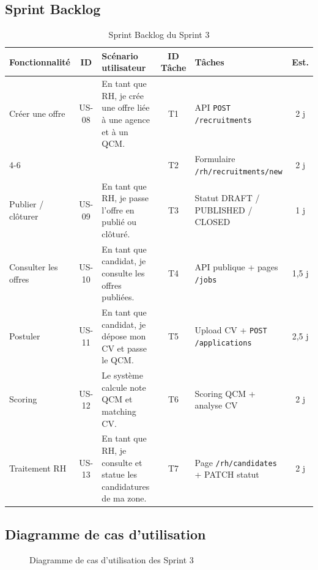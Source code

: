 \subsection{Sprint Backlog}

\begin{table}[htbp]
  \centering
  \scriptsize
  \caption{Sprint Backlog du Sprint 3}
  \label{tab:sprint3-backlog}
  \begin{tabular}{|p{2.0cm}|c|p{4.1cm}|c|p{3.2cm}|c|}
    \hline
    \textbf{Fonctionnalité} & \textbf{ID} & \textbf{Scénario utilisateur} &
    \textbf{ID Tâche} & \textbf{Tâches} & \textbf{Est.} \\
    \hline
    Créer une offre
    & US-08
    & En tant que RH, je crée une offre liée à une agence et à un QCM.
    & T1
    & API \texttt{POST /recruitments}
    & 2 j \\
    \cline{4-6}
    & & & T2 & Formulaire \texttt{/rh/recruitments/new} & 2 j \\
    \hline
    Publier / clôturer
    & US-09
    & En tant que RH, je passe l'offre en publié ou clôturé.
    & T3
    & Statut DRAFT / PUBLISHED / CLOSED
    & 1 j \\
    \hline
    Consulter les offres
    & US-10
    & En tant que candidat, je consulte les offres publiées.
    & T4
    & API publique + pages \texttt{/jobs}
    & 1,5 j \\
    \hline
    Postuler
    & US-11
    & En tant que candidat, je dépose mon CV et passe le QCM.
    & T5
    & Upload CV + \texttt{POST /applications}
    & 2,5 j \\
    \hline
    Scoring
    & US-12
    & Le système calcule note QCM et matching CV.
    & T6
    & Scoring QCM + analyse CV
    & 2 j \\
    \hline
    Traitement RH
    & US-13
    & En tant que RH, je consulte et statue les candidatures de ma zone.
    & T7
    & Page \texttt{/rh/candidates} + PATCH statut
    & 2 j \\
    \hline
  \end{tabular}
\end{table}


\subsection{Diagramme de cas d'utilisation}

\begin{figure}[H]
  \centering
  \caption{Diagramme de cas d'utilisation des Sprint 3}
  \label{fig:uc-sprint3}
\end{figure}


